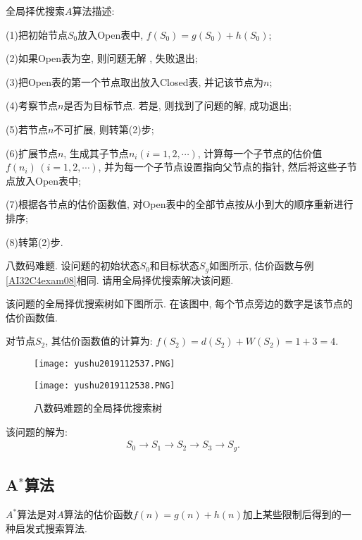 全局择优搜索$A$算法描述:

   (1)把初始节点$S_0$放入Open表中, $f(S_0)=g(S_0)+h(S_0)$;

   (2)如果Open表为空, 则问题无解 , 失败退出;

   (3)把Open表的第一个节点取出放入Closed表, 并记该节点为$n$;

   (4)考察节点$n$是否为目标节点. 若是, 则找到了问题的解, 成功退出;

   (5)若节点$n$不可扩展, 则转第(2)步;

   (6)扩展节点$n$, 生成其子节点$n_i(i=1, 2,\cdots)$, 计算每一个子节点的估价值$f(n_i)\,(i=1, 2, \cdots)$, 并为每一个子节点设置指向父节点的指针, 然后将这些子节点放入Open表中;

   (7)根据各节点的估价函数值, 对Open表中的全部节点按从小到大的顺序重新进行排序;

   (8)转第(2)步.
\begin{example}
  八数码难题. 设问题的初始状态$S_0$和目标状态$S_g$如图所示, 估价函数与例\ref{AI32C4exam08}相同. 请用全局择优搜索解决该问题.
\end{example}
\begin{result}
  该问题的全局择优搜索树如下图所示. 在该图中, 每个节点旁边的数字是该节点的估价函数值.
\end{result}
\begin{example}
对节点$S_2$, 其估价函数值的计算为: $f(S_2)=d(S_2)+W(S_2) =1+3=4$.
\begin{figure}[H]
\centering
\texttt{[image: yushu2019112537.PNG]}
\caption{}
\label{AI32fig37}
\end{figure}
\end{example}
\begin{figure}[H]
\centering
\texttt{[image: yushu2019112538.PNG]}
\caption{八数码难题的全局择优搜索树}
\label{AI32fig38}
\end{figure}
该问题的解为:
\begin{align}
  S_0\rightarrow S_1\rightarrow S_2\rightarrow S_3\rightarrow S_g.
\end{align}
\subsection{A$^*$算法}
$A^*$算法是对$A$算法的估价函数$f(n)=g(n)+h(n)$加上某些限制后得到的一种启发式搜索算法.

